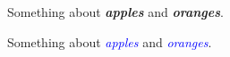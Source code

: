 \documentclass{article}
\begin{document}
\newpage

%



\newpage



\newcommand\kw[1]{\textbf{\itshape #1}}

Something about \kw{apples} and \kw{oranges}.


\newpage



\newcommand\col[1]{\textcolor{blue}{\itshape #1}}



Something about \col{apples} and \col{oranges}.
\end{document}
